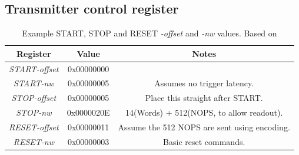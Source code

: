 \subsection{Transmitter control register} %
\label{sub:transmitter_control_register}
    
\begin{table}
  \begin{center}
    \begin{tabular}{c | c | c}
      Register            & Value      & Notes                                       \\
      \hline
      \emph{START-offset} & 0x00000000 &                                             \\
      \emph{START-nw} & 0x00000005 & Assumes no trigger latency.                 \\
      \emph{STOP-offset}  & 0x00000005 & Place this straight after START.            \\
      \emph{STOP-nw}  & 0x0000020E & 14(Words) + 512(NOPS, to allow readout).    \\
      \emph{RESET-offset} & 0x00000011 & Assume the 512 NOPS are sent using encoding.\\
      \emph{RESET-nw} & 0x00000003 & Basic reset commands.                       \\
    \end{tabular}
  \end{center}
  \caption{Example START, STOP and RESET \emph{-offset} and \emph{-nw} values. Based on \cite{lpd_manual}}
  \label{tab:basic_tx_control_reg}
\end{table}
    
